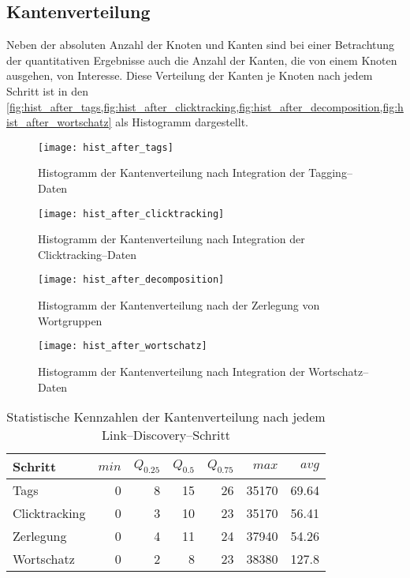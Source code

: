 \subsection{Kantenverteilung}

Neben der absoluten Anzahl der Knoten und Kanten sind bei einer Betrachtung der quantitativen Ergebnisse auch die Anzahl der Kanten, die von einem Knoten ausgehen, von Interesse. Diese Verteilung der Kanten je Knoten nach jedem Schritt ist in den \cref{fig:hist_after_tags,fig:hist_after_clicktracking,fig:hist_after_decomposition,fig:hist_after_wortschatz} als Histogramm dargestellt.

\begin{figure}[p]
\centering
\texttt{[image: hist\_after\_tags]}
\caption{Histogramm der Kantenverteilung nach Integration der Tagging--Daten}
\label{fig:hist_after_tags}
\end{figure}

\begin{figure}[p]
\centering
\texttt{[image: hist\_after\_clicktracking]}
\caption{Histogramm der Kantenverteilung nach Integration der Clicktracking--Daten}
\label{fig:hist_after_clicktracking}
\end{figure}

\begin{figure}[p]
\centering
\texttt{[image: hist\_after\_decomposition]}
\caption{Histogramm der Kantenverteilung nach der Zerlegung von Wortgruppen}
\label{fig:hist_after_decomposition}
\end{figure}

\begin{figure}[p]
\centering
\texttt{[image: hist\_after\_wortschatz]}
\caption{Histogramm der Kantenverteilung nach Integration der Wortschatz--Daten}
\label{fig:hist_after_wortschatz}
\end{figure}

\begin{table}[h]
\centering
\begin{tabular}{lrrrrrr}
    \toprule
    Schritt & \(min\) & \(Q_{0.25}\) & \(Q_{0.5}\) & \(Q_{0.75}\) & \(max\) & \(avg\) \\
    \midrule
    Tags & \num{0} & \num{8} & \num{15} & \num{26} & \num{35170} & \num{69,64} \\
    Clicktracking & \num{0} & \num{3} & \num{10} & \num{23} & \num{35170} & \num{56,41} \\
    Zerlegung & \num{0} & \num{4} & \num{11} & \num{24} & \num{37940} & \num{54,26} \\
    Wortschatz & \num{0} & \num{2} & \num{8} & \num{23} & \num{38380} & \num{127,8} \\
    \bottomrule
\end{tabular}
\caption{Statistische Kennzahlen der Kantenverteilung nach jedem Link--Discovery--Schritt}
\label{tab:discovery_edges_per_node}
\end{table}

